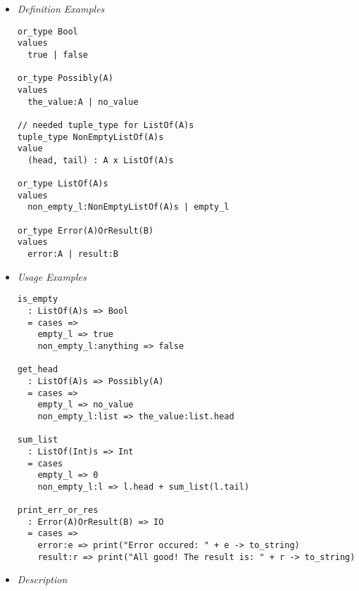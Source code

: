 \documentclass{article}
\begin{document}
\begin{itemize}
\item \textit{Definition Examples}

\begin{verbatim}
or_type Bool
values
  true | false

or_type Possibly(A)
values
  the_value:A | no_value

// needed tuple_type for ListOf(A)s
tuple_type NonEmptyListOf(A)s
value
  (head, tail) : A x ListOf(A)s

or_type ListOf(A)s
values
  non_empty_l:NonEmptyListOf(A)s | empty_l

or_type Error(A)OrResult(B)
values
  error:A | result:B
\end{verbatim}

\item \textit{Usage Examples}

\begin{verbatim}
is_empty
  : ListOf(A)s => Bool
  = cases => 
    empty_l => true
    non_empty_l:anything => false

get_head
  : ListOf(A)s => Possibly(A)
  = cases => 
    empty_l => no_value
    non_empty_l:list => the_value:list.head

sum_list
  : ListOf(Int)s => Int
  = cases
    empty_l => 0
    non_empty_l:l => l.head + sum_list(l.tail)

print_err_or_res
  : Error(A)OrResult(B) => IO
  = cases => 
    error:e => print("Error occured: " + e -> to_string)
    result:r => print("All good! The result is: " + r -> to_string)
\end{verbatim}

\item \textit{Description}


\end{itemize}
\end{document}
